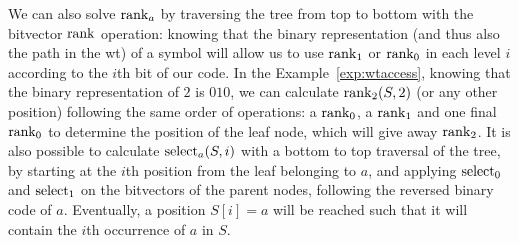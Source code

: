 \documentclass[a4paper,10pt,twoside]{book}
\begin{document}
    We can also solve $\operatorname{rank}_a$ by traversing the tree from top to bottom with the bitvector $\operatorname{rank}$ operation: knowing that the binary representation (and thus also the path in the \gls{wt}) of a symbol will allow us to use $\operatorname{rank}_1$ or $\operatorname{rank}_0$ in each level $i$ according to the $i$th bit of our code. In the Example~\ref{exp:wtaccess}, knowing that the binary representation of $2$ is $010$, we can calculate $\operatorname{rank}_2(S,2)$ (or any other position) following the same order of operations: a $\operatorname{rank}_0$, a $\operatorname{rank}_1$ and one final $\operatorname{rank}_0$ to determine the position of the leaf node, which will give away $\operatorname{rank}_2$. It is also possible to calculate $\operatorname{select}_a(S,i)$ with a bottom to top traversal of the tree, by starting at the $i$th position from the leaf belonging to $a$, and applying $\operatorname{select}_0$ and $\operatorname{select}_1$ on the bitvectors of the parent nodes, following the reversed binary code of $a$. Eventually, a position $S[i]=a$ will be reached such that it will contain the $i$th occurrence of $a$ in $S$.
    
\end{document}
